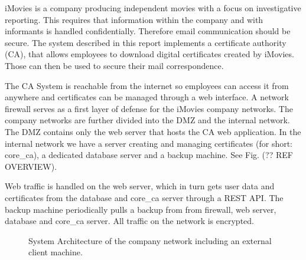 \documentclass[english]{article}
\begin{document}


iMovies is a company producing independent movies with a focus on investigative reporting. This requires that information within the company and with informants is handled confidentially. Therefore email communication should be secure. 
The system described in this report implements a certificate authority (CA), that allows employees to download digital certificates created by iMovies. Those can then be used to secure their mail correspondence. 

The CA System is reachable from the internet so employees can access it from anywhere and certificates can be managed through a web interface. A network firewall serves as a first layer of defense for the iMovies company networks. The company networks are further divided into the DMZ and the internal network. The DMZ contains only the web server that hosts the CA web application. In the internal network we have a server creating and managing certificates (for short: core\_ca), a dedicated database server and a backup machine. See Fig. (?? REF OVERVIEW). 

Web traffic is handled on the web server, which in turn gets user data and certificates from the database and core\_ca server through a REST API. The backup machine periodically pulls a backup from from firewall, web server, database and core\_ca server. All traffic on the network is encrypted.



\begin{figure}[htb!]
\caption{System Architecture of the company network including an external client machine.}
\centering
\label{fig:system_arch}
\end{figure}
\end{document}
